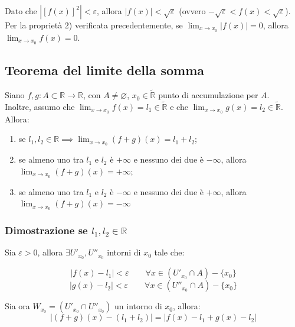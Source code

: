 \documentclass{article}
\begin{document}
\noindent Dato che $|[f(x)]^2| < \varepsilon$, allora $|f(x)| < \sqrt{\varepsilon}$ (ovvero $- \sqrt{\varepsilon} < f(x) < \sqrt{\varepsilon}$). Per la proprietà 2) verificata precedentemente, se $\lim_{x \to x_0} |f(x)| = 0$, allora $\lim_{x \to x_0} f(x) = 0$.

\subsection{Teorema del limite della somma}
Siano $f, g: A \subset \mathbb{R} \xrightarrow{} \mathbb{R}$, con $A \neq \varnothing$, $x_0 \in \widetilde{\mathbb{R}}$ punto di accumulazione per $A$. \\
Inoltre, assumo che $\lim_{x \to x_0} f(x) = l_1 \in \widetilde{\mathbb{R}}$ e che $\lim_{x \to x_0} g(x) = l_2 \in \widetilde{\mathbb{R}}$. Allora:

\begin{enumerate}[label=\alph{enumi})]
    \item se $l_1, l_2 \in \mathbb{R} \implies \lim_{x \to x_0} (f + g)(x) = l_1 + l_2$;
    \item se almeno uno tra $l_1$ e $l_2$ è $+ \infty$ e nessuno dei due è $- \infty$, allora $\lim_{x \to x_0} (f + g)(x) = + \infty$;
    \item se almeno uno tra $l_1$ e $l_2$ è $- \infty$ e nessuno dei due è $+ \infty$, allora $\lim_{x \to x_0} (f + g)(x) = - \infty$
\end{enumerate}

\subsubsection{Dimostrazione se $l_1, l_2 \in \mathbb{R}$}
Sia $\varepsilon > 0$, allora $\exists U'_{x_0}, U''_{x_0}$ intorni di $x_0$ tale che:

\begin{equation*}
    |f(x) - l_1| < \varepsilon \qquad \forall x \in (U'_{x_0} \cap A) - \{x_0\}
\end{equation*}
\begin{equation*}
    |g(x) - l_2| < \varepsilon \qquad \forall x \in (U''_{x_0} \cap A) - \{x_0\}
\end{equation*}

\noindent Sia ora $W_{x_0} = (U'_{x_0} \cap U''_{x_0})$ un intorno di $x_0$, allora: 
\begin{equation*}
    |(f + g)(x) - (l_1 + l_2)| = |f(x) - l_1 + g(x) - l_2|
\end{equation*}
\end{document}
